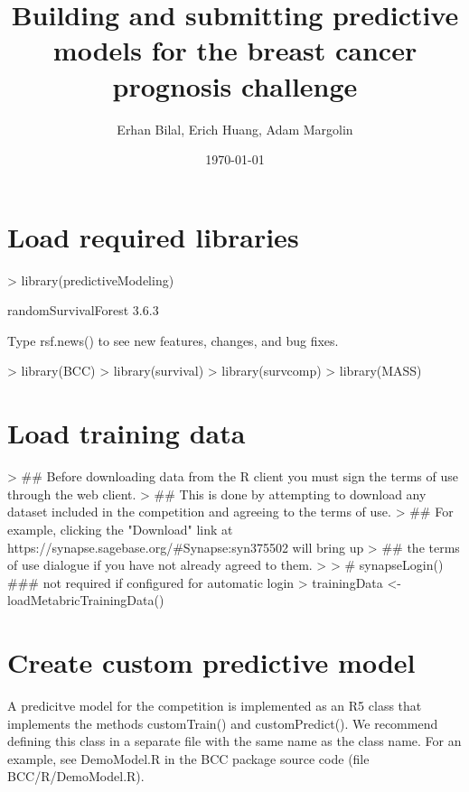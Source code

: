 \documentclass[10pt]{article}
\title{Building and submitting predictive models for the breast cancer prognosis challenge}
\author{Erhan Bilal, Erich Huang, Adam Margolin}
\date{\today}
\begin{document}


\maketitle

\section{Load required libraries}
\begin{Schunk}
\begin{Sinput}
> library(predictiveModeling)
\end{Sinput}
\begin{Soutput}
randomSurvivalForest 3.6.3

Type rsf.news() to see new features, changes, and bug fixes.
\end{Soutput}
\begin{Sinput}
> library(BCC)
> library(survival)
> library(survcomp)
> library(MASS)
\end{Sinput}
\end{Schunk}

\section{Load training data}
\begin{Schunk}
\begin{Sinput}
> ## Before downloading data from the R client you must sign the terms of use through the web client.
> ## This is done by attempting to download any dataset included in the competition and agreeing to the terms of use.
> ## For example, clicking the "Download" link at https://synapse.sagebase.org/\#Synapse:syn375502 will bring up
> ## the terms of use dialogue if you have not already agreed to them.
> 
> # synapseLogin() ### not required if configured for automatic login
> trainingData <- loadMetabricTrainingData()
\end{Sinput}
\end{Schunk}

\section{Create custom predictive model}
A predicitve model for the competition is implemented as an R5 class that implements the methods customTrain() and customPredict(). We recommend defining this class in a separate file with the same name as the class name. For an example, see DemoModel.R in the BCC package source code (file BCC/R/DemoModel.R).
\end{document}
